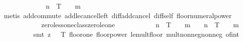 \begin{isabellebody}
\ \ \ \ \ \ \isamarkupfalse%
\ \isamarkupfalse%
\ {\isachardoublequoteopen}{\isachardot}{\kern0pt}{\isachardot}{\kern0pt}{\isachardot}{\kern0pt}\ {\isasymle}\ {\isasymlfloor}{}\ {\isacharcircum}{\kern0pt}\ n\ {\isacharasterisk}{\kern0pt}\ T{\isasymrfloor}\ {\isacharasterisk}{\kern0pt}\ {\isasymlfloor}{\isacharparenleft}{\kern0pt}{}\ {\isacharcircum}{\kern0pt}\ {\isacharparenleft}{\kern0pt}m{\isacharplus}{\kern0pt}{}{\isacharparenright}{\kern0pt}{\isacharparenright}{\kern0pt}{\isasymrfloor}{\isachardoublequoteclose}\isanewline
\ \ \ \ \ \ \ \ \isamarkupfalse%
\ {\isacharparenleft}{\kern0pt}metis\ add{\isachardot}{\kern0pt}commute\ add{\isacharunderscore}{\kern0pt}le{\isacharunderscore}{\kern0pt}cancel{\isacharunderscore}{\kern0pt}left\ diff{\isacharunderscore}{\kern0pt}add{\isacharunderscore}{\kern0pt}cancel\ diff{\isacharunderscore}{\kern0pt}self\ floor{\isacharunderscore}{\kern0pt}numeral{\isacharunderscore}{\kern0pt}power\isanewline
\ \ \ \ \ \ \ \ \ \ \ \ zero{\isacharunderscore}{\kern0pt}less{\isacharunderscore}{\kern0pt}one{\isacharunderscore}{\kern0pt}class{\isachardot}{\kern0pt}zero{\isacharunderscore}{\kern0pt}le{\isacharunderscore}{\kern0pt}one{\isacharparenright}{\kern0pt}\isanewline
\ \ \ \ \ \ \isamarkupfalse%
\ \isamarkupfalse%
\ {\isachardoublequoteopen}{\isasymlfloor}{}\ {\isacharcircum}{\kern0pt}\ n\ {\isacharasterisk}{\kern0pt}\ T{\isasymrfloor}\ {\isacharasterisk}{\kern0pt}\ {\isasymlfloor}{\isacharparenleft}{\kern0pt}{}\ {\isacharcircum}{\kern0pt}\ {\isacharparenleft}{\kern0pt}m{\isacharplus}{\kern0pt}{}{\isacharparenright}{\kern0pt}{\isacharparenright}{\kern0pt}{\isasymrfloor}\ {\isasymle}\ {\isasymlfloor}{}\ {\isacharcircum}{\kern0pt}\ n\ {\isacharasterisk}{\kern0pt}\ T\ {\isacharasterisk}{\kern0pt}\ {\isacharparenleft}{\kern0pt}{}\ {\isacharcircum}{\kern0pt}\ {\isacharparenleft}{\kern0pt}m{\isacharplus}{\kern0pt}{}{\isacharparenright}{\kern0pt}{\isacharparenright}{\kern0pt}{\isasymrfloor}{\isachardoublequoteclose}\isanewline
\ \ \ \ \ \ \ \ \isamarkupfalse%
\ {\isacharparenleft}{\kern0pt}smt\ {\isacharparenleft}{\kern0pt}z{}{\isacharparenright}{\kern0pt}\ {\isacartoucheopen}{}\ {\isacharless}{\kern0pt}\ T{\isacartoucheclose}\ floor{\isacharunderscore}{\kern0pt}one\ floor{\isacharunderscore}{\kern0pt}power\ le{\isacharunderscore}{\kern0pt}mult{\isacharunderscore}{\kern0pt}floor\ mult{\isacharunderscore}{\kern0pt}nonneg{\isacharunderscore}{\kern0pt}nonneg\ of{\isacharunderscore}{\kern0pt}int{\isacharunderscore}{\kern0pt}{}\isanewline

\end{isabellebody}
